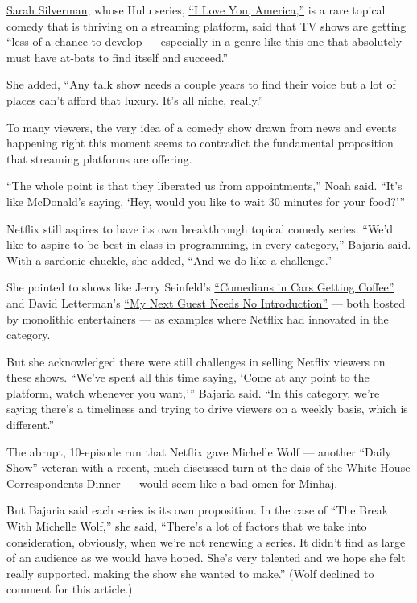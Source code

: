 \href{https://www.nytimes.com/2017/10/04/arts/television/sarah-silverman-wants-to-pop-your-bubble.html}{Sarah
Silverman}, whose Hulu series,
\href{https://www.youtube.com/watch?v=WDhhss6nuSY}{``I Love You,
America,''} is a rare topical comedy that is thriving on a streaming
platform, said that TV shows are getting ``less of a chance to develop
--- especially in a genre like this one that absolutely must have
at-bats to find itself and succeed.''

She added, ``Any talk show needs a couple years to find their voice but
a lot of places can't afford that luxury. It's all niche, really.''

To many viewers, the very idea of a comedy show drawn from news and
events happening right this moment seems to contradict the fundamental
proposition that streaming platforms are offering.

``The whole point is that they liberated us from appointments,'' Noah
said. ``It's like McDonald's saying, `Hey, would you like to wait 30
minutes for your food?'''

Netflix still aspires to have its own breakthrough topical comedy
series. ``We'd like to aspire to be best in class in programming, in
every category,'' Bajaria said. With a sardonic chuckle, she added,
``And we do like a challenge.''

She pointed to shows like Jerry Seinfeld's
\href{https://www.netflix.com/title/80171362}{``Comedians in Cars
Getting Coffee''} and David Letterman's
\href{https://www.netflix.com/title/80209096}{``My Next Guest Needs No
Introduction''} --- both hosted by monolithic entertainers --- as
examples where Netflix had innovated in the category.

But she acknowledged there were still challenges in selling Netflix
viewers on these shows. ``We've spent all this time saying, `Come at any
point to the platform, watch whenever you want,''' Bajaria said. ``In
this category, we're saying there's a timeliness and trying to drive
viewers on a weekly basis, which is different.''

The abrupt, 10-episode run that Netflix gave Michelle Wolf --- another
``Daily Show'' veteran with a recent,
\href{https://www.nytimes.com/2018/04/29/business/media/michelle-wolfs-routine-sets-off-a-furor-at-an-annual-washington-dinner.html}{much-discussed
turn at the dais} of the White House Correspondents Dinner --- would
seem like a bad omen for Minhaj.

But Bajaria said each series is its own proposition. In the case of
``The Break With Michelle Wolf,'' she said, ``There's a lot of factors
that we take into consideration, obviously, when we're not renewing a
series. It didn't find as large of an audience as we would have hoped.
She's very talented and we hope she felt really supported, making the
show she wanted to make.'' (Wolf declined to comment for this article.)

